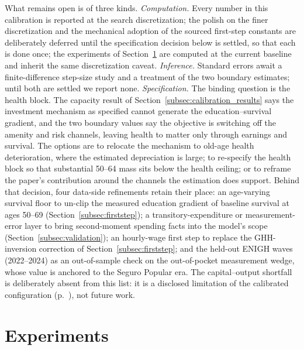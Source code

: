 \documentclass[12pt,a4paper]{article}
\begin{document}
What remains open is of three kinds. \emph{Computation.} Every number in this calibration is reported at the search discretization; the polish on the finer discretization and the mechanical adoption of the sourced first-step constants are deliberately deferred until the specification decision below is settled, so that each is done once; the experiments of Section~\ref{sec:experiments} are computed at the current baseline and inherit the same discretization caveat. \emph{Inference.} Standard errors await a finite-difference step-size study and a treatment of the two boundary estimates; until both are settled we report none. \emph{Specification.} The binding question is the health block. The capacity result of Section~\ref{subsec:calibration_results} says the investment mechanism as specified cannot generate the education--survival gradient, and the two boundary values say the objective is switching off the amenity and risk channels, leaving health to matter only through earnings and survival. The options are to relocate the mechanism to old-age health deterioration, where the estimated depreciation is large; to re-specify the health block so that substantial 50--64 mass sits below the health ceiling; or to reframe the paper's contribution around the channels the estimation does support. Behind that decision, four data-side refinements retain their place: an age-varying survival floor to un-clip the measured education gradient of baseline survival at ages 50--69 (Section~\ref{subsec:firststep}); a transitory-expenditure or measurement-error layer to bring second-moment spending facts into the model's scope (Section~\ref{subsec:validation}); an hourly-wage first step to replace the GHH-inversion correction of Section~\ref{subsec:firststep}; and the held-out ENIGH waves (2022--2024) as an out-of-sample check on the out-of-pocket measurement wedge, whose value is anchored to the Seguro Popular era. The capital--output shortfall is deliberately absent from this list: it is a disclosed limitation of the calibrated configuration (p.~\pageref{par:superseded}), not future work.

\section{Experiments}
\label{sec:experiments}
\label{sec:policy}
\end{document}
